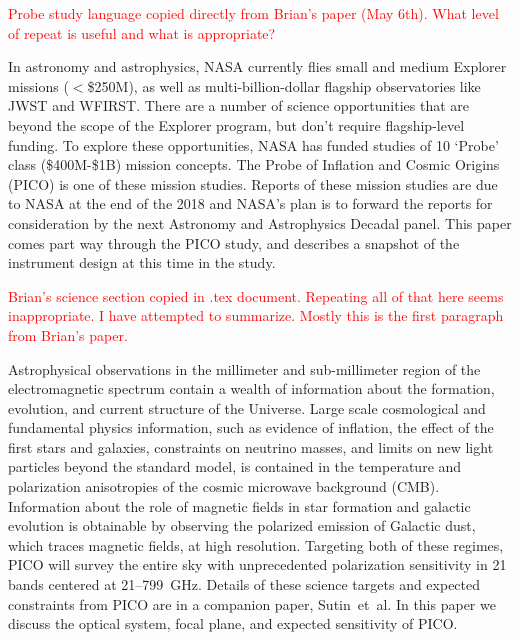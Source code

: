 \documentclass[]{spie}  %
\newcommand{\comr}[1]{\textcolor{red}{#1}}
\begin{document}
\comr{Probe study language copied directly from Brian's paper (May 6th).  What level of repeat is useful and what is appropriate?}

In astronomy and astrophysics, NASA currently flies small and medium Explorer missions ($<$\$250M), as well as multi-billion-dollar flagship observatories like JWST and WFIRST. There are a number of science opportunities that are beyond the scope of the Explorer program, but don't require flagship-level funding. To explore these opportunities, NASA has funded studies of 10 `Probe' class (\$400M-\$1B) mission concepts. The Probe of Inflation and Cosmic Origins (PICO) is one of these mission studies. Reports of these mission studies are due to NASA at the end of the 2018 and NASA's plan is to forward the reports for consideration by the next Astronomy and Astrophysics Decadal panel. This paper comes part way through the PICO study, and describes a snapshot of the  instrument design at this time in the study.


\comr{Brian's science section copied in .tex document. Repeating all of that here seems inappropriate. I have attempted to summarize. Mostly this is the first paragraph from Brian's paper.}

Astrophysical observations in the  millimeter and sub-millimeter region of the electromagnetic spectrum contain a wealth of information about 
the formation, evolution, and current structure of the Universe.  Large scale cosmological and fundamental physics information, such as 
evidence of inflation, the effect of the first stars and galaxies, constraints on neutrino masses, and limits on new light particles beyond 
the standard model, is contained in the temperature and polarization anisotropies of the cosmic microwave background (CMB).  Information 
about the role of magnetic fields in star formation and galactic evolution is obtainable by observing the polarized emission of Galactic dust, which 
traces magnetic fields, at high resolution. Targeting both of these regimes, PICO will survey the entire sky with unprecedented polarization sensitivity 
in 21 bands centered at 21--799~GHz.  Details of these science targets and expected constraints from PICO are in a companion paper, Sutin~et~al.\cite{brian_spie} 
In this paper we discuss the optical system, focal plane, and expected sensitivity of PICO.

\end{document}
